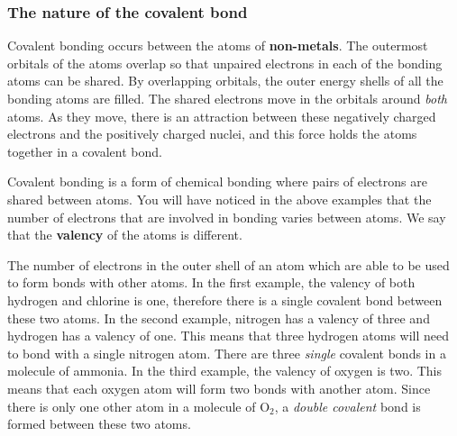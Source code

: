             \subsubsection{ The nature of the covalent bond}
            \nopagebreak
        \label{m38704*id138956}Covalent bonding occurs between the atoms of \textbf{non-metals}. The outermost orbitals of the atoms overlap so that unpaired electrons in each of the bonding atoms can be shared. By overlapping orbitals, the outer energy shells of all the bonding atoms are filled. The shared electrons move in the orbitals around \textsl{both} atoms. As they move, there is an attraction between these negatively charged electrons and the positively charged nuclei, and this force holds the atoms together in a covalent bond.\par 
\label{m38704*fhsst!!!underscore!!!id94}
 { \label{m38704*meaningfhsst!!!underscore!!!id94}
        Covalent bonding is a form of chemical bonding where pairs of electrons are shared between atoms.} 
        \label{m38704*id139505}You will have noticed in the above examples that the number of electrons that are involved in bonding varies between atoms. We say that the \textbf{valency} of the atoms is different.\par 
\label{m38704*fhsst!!!underscore!!!id165}
 { \label{m38704*meaningfhsst!!!underscore!!!id165}
The number of electrons in the outer shell of an atom which are able to be used to form bonds with other atoms. } 
        \label{m38704*id139533}In the first example, the valency of both hydrogen and chlorine is one, therefore there is a single covalent bond between these two atoms. In the second example, nitrogen has a valency of three and hydrogen has a valency of one. This means that three hydrogen atoms will need to bond with a single nitrogen atom. There are three \textsl{single} covalent bonds in a molecule of ammonia. In the third example, the valency of oxygen is two. This means that each oxygen atom will form two bonds with another atom. Since there is only one other atom in a molecule of ${\mathrm{O}}_{2}$, a \textsl{double covalent} bond is formed between these two atoms.\par 
\label{m38704*notfhsst!!!underscore!!!id169}
